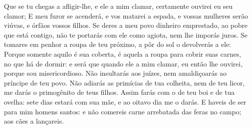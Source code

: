 {Que se tu chegas a afligir-lhe, e ele a mim clamar, certamente ouvirei eu seu clamor;
E meu furor se acenderá, e vos matarei a espada, e vossas mulheres serão viúvas, e órfãos vossos filhos.
Se deres a meu povo dinheiro emprestado, ao pobre que está contigo, não te portarás com ele como agiota, nem lhe imporás juros.
Se tomares em penhor a roupa de teu próximo, a pôr do sol o devolverás a ele:
Porque somente aquilo é sua coberta, é aquela a roupa para cobrir suas carnes, no que há de dormir: e será que quando ele a mim clamar, eu então lhe ouvirei, porque sou misericordioso.
Não insultarás aos juízes, nem amaldiçoarás ao príncipe de teu povo.
Não adiarás as primícias de tua colheita, nem de teu licor, me darás o primogênito de teus filhos.
Assim farás com o de teu boi e de tua ovelha: sete dias estará com sua mãe, e ao oitavo dia me o darás.
E haveis de ser para mim homens santos: e não comereis carne arrebatada das feras no campo; aos cães a lançareis.

}
